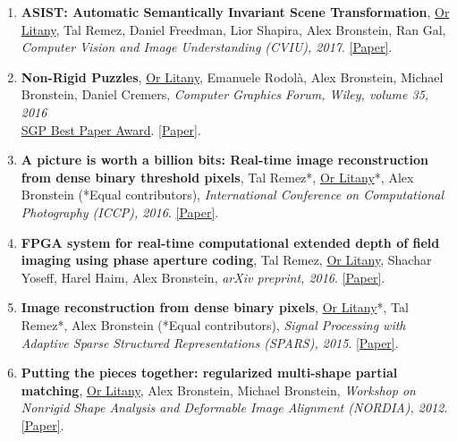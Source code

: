 \begin{enumerate}[leftmargin=*]
    \item \textbf{ASIST: Automatic Semantically Invariant Scene Transformation}, \underline{Or Litany}, Tal Remez, Daniel Freedman, Lior Shapira, Alex Bronstein, Ran Gal, \textit{Computer Vision and Image Understanding (CVIU), 2017}. \href{http://arxiv.org/abs/1512.01515}{[Paper]}.
    \item \textbf{Non-Rigid Puzzles}, \underline{Or Litany}, Emanuele Rodolà, Alex Bronstein, Michael Bronstein, Daniel Cremers, \textit{Computer Graphics Forum, Wiley, volume 35, 2016}\\ \underline{SGP Best Paper Award}. \href{http://vision.in.tum.de/_media/spezial/bib/litany16.pdf}{[Paper]}.
    \item \textbf{A picture is worth a billion bits: Real-time image reconstruction from dense binary threshold pixels}, Tal Remez*, \underline{Or Litany}*, Alex Bronstein (*Equal contributors), \textit{International Conference on Computational Photography (ICCP), 2016}. \href{https://arxiv.org/pdf/1510.04601.pdf}{[Paper]}.
    \item \textbf{FPGA system for real-time computational extended depth of field imaging using phase aperture coding}, Tal Remez, \underline{Or Litany}, Shachar Yoseff, Harel Haim, Alex Bronstein, \textit{arXiv preprint, 2016}. \href{https://arxiv.org/abs/1608.01074}{[Paper]}.
    \item \textbf{Image reconstruction from dense binary pixels}, \underline{Or Litany}*, Tal Remez*, Alex Bronstein (*Equal contributors), \textit{Signal Processing with Adaptive Sparse Structured Representations (SPARS), 2015}. \href{http://arxiv.org/abs/1512.01774}{[Paper]}.
    \item \textbf{Putting the pieces together: regularized multi-shape partial matching}, \underline{Or Litany}, Alex Bronstein, Michael Bronstein, \textit{Workshop on Nonrigid Shape Analysis and Deformable Image Alignment (NORDIA), 2012}. \href{https://vista.cs.technion.ac.il/wp-content/uploads/2018/10/LitBroBroNORDIA12.pdf}{[Paper]}.
\end{enumerate}
